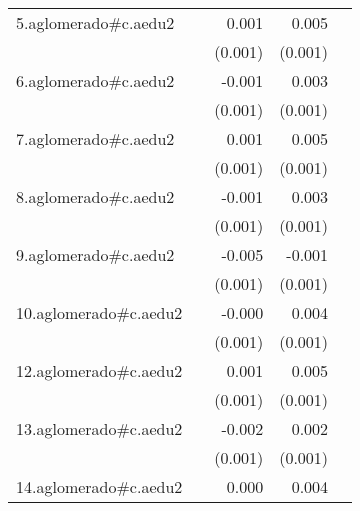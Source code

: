 {\begin{longtable}{l*{4}{D{.}{.}{-1}}}
\addlinespace
5.aglomerado#c.aedu2&                     &       0.001         &       0.005\sym{***}&                     \\
            &                     &     (0.001)         &     (0.001)         &                     \\
\addlinespace
6.aglomerado#c.aedu2&                     &      -0.001         &       0.003\sym{***}&                     \\
            &                     &     (0.001)         &     (0.001)         &                     \\
\addlinespace
7.aglomerado#c.aedu2&                     &       0.001         &       0.005\sym{***}&                     \\
            &                     &     (0.001)         &     (0.001)         &                     \\
\addlinespace
8.aglomerado#c.aedu2&                     &      -0.001         &       0.003\sym{***}&                     \\
            &                     &     (0.001)         &     (0.001)         &                     \\
\addlinespace
9.aglomerado#c.aedu2&                     &      -0.005\sym{***}&      -0.001         &                     \\
            &                     &     (0.001)         &     (0.001)         &                     \\
\addlinespace
10.aglomerado#c.aedu2&                     &      -0.000         &       0.004\sym{***}&                     \\
            &                     &     (0.001)         &     (0.001)         &                     \\
\addlinespace
12.aglomerado#c.aedu2&                     &       0.001         &       0.005\sym{***}&                     \\
            &                     &     (0.001)         &     (0.001)         &                     \\
\addlinespace
13.aglomerado#c.aedu2&                     &      -0.002         &       0.002\sym{*}  &                     \\
            &                     &     (0.001)         &     (0.001)         &                     \\
\addlinespace
14.aglomerado#c.aedu2&                     &       0.000         &       0.004\sym{***}&                     \\

\end{longtable}}
